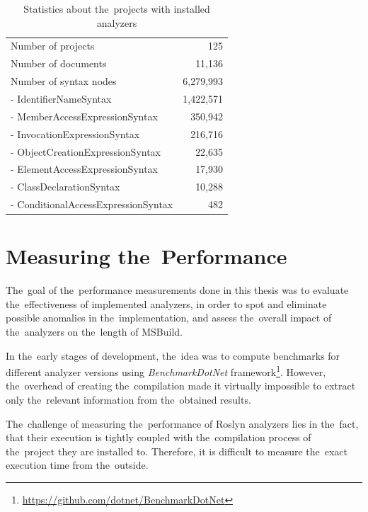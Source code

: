 \documentclass[
  digital, %
  table,   %
  lof,     %
  lot,     %
  oneside,
]{fithesis3}
\begin{document}
\begin{table}
\begin{tabularx}{\textwidth}{Xr}
\toprule
Number of projects                  & 125 \\
Number of documents              & 11,136 \\
Number of syntax nodes        & 6,279,993 \\
- IdentifierNameSyntax        & 1,422,571 \\
- MemberAccessExpressionSyntax  & 350,942 \\
- InvocationExpressionSyntax     & 216,716 \\
- ObjectCreationExpressionSyntax & 22,635 \\ 
- ElementAccessExpressionSyntax  & 17,930 \\
- ClassDeclarationSyntax         & 10,288 \\ 
- ConditionalAccessExpressionSyntax & 482 \\

\bottomrule

\end{tabularx}
\caption{Statistics about the~projects with installed analyzers}
\label{tab:solution-statistics}
\end{table}

\section{Measuring the~Performance}
The~goal of the~performance measurements done in this thesis was to evaluate the~effectiveness of implemented analyzers, in order to spot and eliminate possible anomalies in the~implementation, and assess the~overall impact of the~analyzers on the~length of MSBuild.

In the~early stages of development, the~idea was to compute benchmarks for different analyzer versions using \textit{BenchmarkDotNet} framework\footnote{\url{https://github.com/dotnet/BenchmarkDotNet}}. However, the~overhead of creating the~compilation made it virtually impossible to extract only the~relevant information from the~obtained results.

The~challenge of measuring the~performance of Roslyn analyzers lies in the~fact, that their execution is tightly coupled with the~compilation process of the~project they are installed to. Therefore, it is difficult to measure the~exact execution time from the~outside. 
\end{document}
